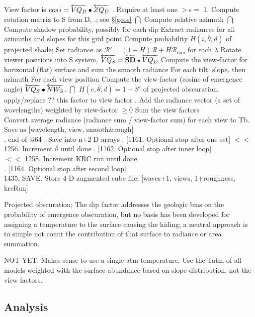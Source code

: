 \documentclass{article}
\begin{document}
\qii View factor is $ \cos i =\overleftarrow{VQ_D} \bullet \overleftarrow{ZQ_D}$ . Require at least one $> \epsilon = $ 1.
\qi Compute rotation matrix to S from D, .; see \S \ref{geos}  
\qii \ddag  $\bigcap$ Compute relative azimuth
\qii \ddag $\bigcap$ Compute shadow probability, possibly for each dip
\qi Extract radiances for all azimuths and slopes for this grid point
\qiii Compute probability $H(i, \overline{\theta}, d)$ of projected shade; Set radiance as $\mathcal{R}' = (1-H)\mathcal{R} + H \mathcal{R_\mathrm{min}}$ for each $\lambda $
\qi Rotate viewer positions into S system, $\overleftarrow{VQ_S} = \widetilde {\mathbf{ SD }} \star  \overleftarrow{VQ_D}$
\qi Compute the view-factor for horizontal (flat) surface and sum the smooth radiance
\qi For each tilt: slope, then azimuth
\qii For each view position
\qiii Compute the view-factor (cosine of emergence angle) $\overleftarrow{VQ_S} \bullet \overleftarrow{NW_S}$. 
\qiiii \ddag $\bigcap$ $H(e,\overline{\theta}, d) =1-S' $ of projected obscuration; apply/replace ??  this factor to view factor .
\qiii Add the radiance vector (a set of wavelengths) weighted by view-factor $ \geq 0$
\qiii Sum the view factors
\\ Convert average radiance (radiance sum / view-factor sum) for each view to Tb. Save as [wavelength, view, smooth\&rough]
\\ .  \hrulefill end of @64 \hrulefill \hspace{3.in}
. Save into n+2 D arrays
\qii . [1161. Optional stop after one set]
\qi $<<$ 1256. Increment $\overline{\theta}$ until done
\qi . [1162. Optional stop after inner loop]
\\ $<<$ 1258. Increment KRC run until done
\\ . [1164. Optional stop after second loop]
\\ 1435. SAVE. Store 4-D augmented cube file; [waves+1, views, 1+roughness, krcRun]

\vspace{3mm} Projected obscuration; The dip factor addresses the geologic bias on 
the probability of emergence obscuration, but no basis has been developed for assigning a temperature to the surface causing the hiding; a neutral approach is to simple not count the contribution of that surface to radiance or area summation.

\vspace{3mm} NOT YET: Makes sense to use a single atm temperature. Use the Tatm
of all models weighted with the surface abundance based on slope distribution,
not the view factors.


\subsection{Analysis}
\end{document}
